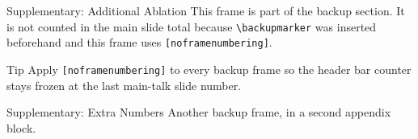 \documentclass[aspectratio=169]{beamer}
\begin{document}
\backupmarker


\begin{frame}[noframenumbering]{Supplementary: Additional Ablation}
  This frame is part of the backup section. It is not counted in the main
  slide total because \texttt{\textbackslash backupmarker} was inserted
  beforehand and this frame uses \texttt{[noframenumbering]}.

  \begin{block}{Tip}
    Apply \texttt{[noframenumbering]} to every backup frame so the header
    bar counter stays frozen at the last main-talk slide number.
  \end{block}
\end{frame}


\begin{frame}[noframenumbering]{Supplementary: Extra Numbers}
  Another backup frame, in a second appendix block.
\end{frame}
\end{document}
